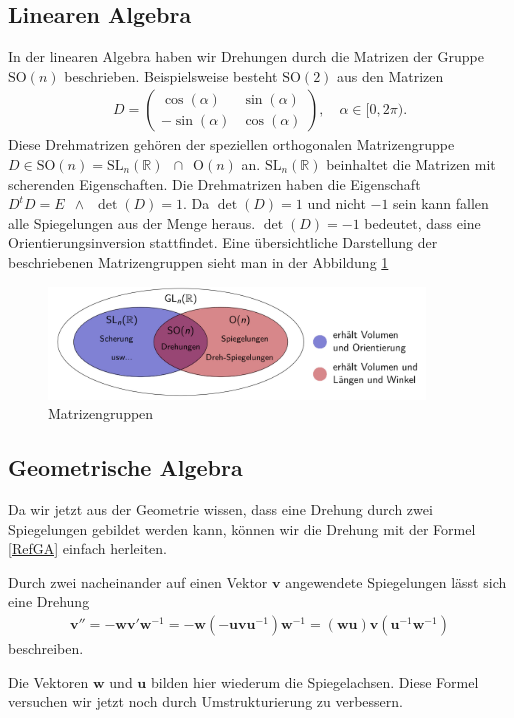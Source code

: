 \subsection{Linearen Algebra}
In der linearen Algebra haben wir Drehungen durch die Matrizen der Gruppe $\text{SO}(n)$ beschrieben. Beispielsweise besteht $\text{SO}(2)$  aus den Matrizen
\begin{align}
D = 
\begin{pmatrix}
\cos(\alpha) & \sin(\alpha) \\
-\sin(\alpha) & \cos(\alpha) 
\end{pmatrix},\quad
\alpha \in [0, 2\pi).
\end{align}
Diese Drehmatrizen gehören der speziellen orthogonalen Matrizengruppe $D\in \text{SO}(n) = \text{SL}_n(\mathbb{R})\enspace \cap \enspace \text{O}(n)$ an. $\text{SL}_n(\mathbb{R})$ beinhaltet die Matrizen mit scherenden Eigenschaften. Die Drehmatrizen haben die Eigenschaft $D^t D = E \enspace \land \enspace \det(D)=1$. Da $\det(D) = 1$ und nicht $-1$ sein kann fallen alle Spiegelungen aus der Menge heraus. $\det(D) = -1$ bedeutet, dass eine Orientierungsinversion stattfindet. Eine übersichtliche Darstellung der beschriebenen Matrizengruppen sieht man in der Abbildung \ref{BildMatrizenGruppen}

\begin{figure}
	\centering
	\includegraphics[width=10cm]{papers/clifford/Bilder/MatrizenGruppen.png}
	\caption{Matrizengruppen}
	\label{BildMatrizenGruppen}
\end{figure}

\subsection{Geometrische Algebra}
Da wir jetzt aus der Geometrie wissen, dass eine Drehung durch zwei Spiegelungen gebildet werden kann, können wir die Drehung mit der Formel \eqref{RefGA} einfach herleiten.
\begin{satz}
	Durch zwei nacheinander auf einen Vektor $\mathbf{v}$ angewendete Spiegelungen lässt sich eine Drehung 
	\begin{align} \label{rotGA}
	\mathbf{v}'' = -\mathbf{wv}'\mathbf{w}^{-1} = -\mathbf{w}(-\mathbf{uvu}^{-1})\mathbf{w}^{-1} = (\mathbf{wu})\mathbf{v}(\mathbf{u}^{-1}\mathbf{w}^{-1})
	\end{align}
	beschreiben.
\end{satz}
Die Vektoren $\mathbf{w}$ und $\mathbf{u}$ bilden hier wiederum die Spiegelachsen. Diese Formel versuchen wir jetzt noch durch Umstrukturierung zu verbessern. 
